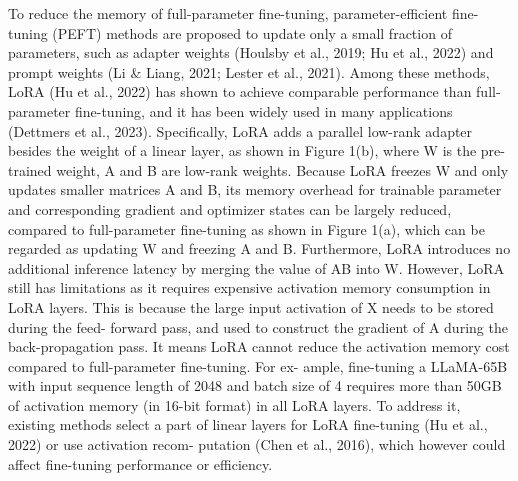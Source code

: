 \documentclass[withindex,glossary]{cam-thesis}
\begin{document}
To reduce the memory of full-parameter fine-tuning, parameter-efficient fine-tuning (PEFT) methods are proposed to update only a small fraction of parameters, such as adapter weights (Houlsby et al., 2019; Hu et al., 2022) and prompt weights (Li & Liang, 2021; Lester et al., 2021). Among these methods, LoRA (Hu et al., 2022) has shown to achieve comparable performance than full-parameter fine-tuning, and it has been widely used in many applications (Dettmers et al., 2023).
Specifically, LoRA adds a parallel low-rank adapter besides the weight of a linear layer, as shown in Figure 1(b), where W is the pre-trained weight, A and B are low-rank weights. Because LoRA freezes W and only updates smaller matrices A and B, its memory overhead for trainable parameter and corresponding gradient and optimizer states can be largely reduced, compared to full-parameter fine-tuning as shown in Figure 1(a), which can be regarded as updating W and freezing A and B. Furthermore, LoRA introduces no additional inference latency by merging the value of AB into W. However, LoRA still has limitations as it requires expensive activation memory consumption in LoRA layers. This is because the large input activation of X needs to be stored during the feed- forward pass, and used to construct the gradient of A during the back-propagation pass. It means LoRA cannot reduce the activation memory cost compared to full-parameter fine-tuning. For ex- ample, fine-tuning a LLaMA-65B with input sequence length of 2048 and batch size of 4 requires more than 50GB of activation memory (in 16-bit format) in all LoRA layers. To address it, existing methods select a part of linear layers for LoRA fine-tuning (Hu et al., 2022) or use activation recom- putation (Chen et al., 2016), which however could affect fine-tuning performance or efficiency.




\end{document}
